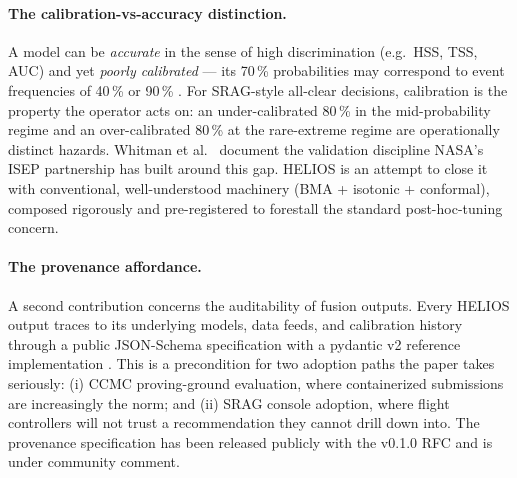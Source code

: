 \documentclass[11pt,letterpaper]{article}
\begin{document}
\paragraph{The calibration-vs-accuracy distinction.}
A model can be \emph{accurate} in the sense of high discrimination
(e.g.\ HSS, TSS, AUC) and yet \emph{poorly calibrated} --- its 70\,\%
probabilities may correspond to event frequencies of 40\,\% or 90\,\%
\cite{niculescu2005}.  For SRAG-style all-clear decisions, calibration is the
property the operator acts on: an under-calibrated 80\,\% in the
mid-probability regime and an over-calibrated 80\,\% at the rare-extreme
regime are operationally distinct hazards.  Whitman et al.\ \cite{whitman2023,whitman2024}
document the validation discipline NASA's ISEP partnership has built around
this gap.  HELIOS is an attempt to close it with conventional, well-understood
machinery (BMA + isotonic + conformal), composed rigorously and pre-registered
to forestall the standard post-hoc-tuning concern.

\paragraph{The provenance affordance.}
A second contribution concerns the auditability of fusion outputs.  Every
HELIOS output traces to its underlying models, data feeds, and calibration
history through a public JSON-Schema specification with a pydantic v2 reference
implementation \cite{helios_provenance_spec}.  This is a precondition for two
adoption paths the paper takes seriously: (i) CCMC proving-ground evaluation,
where containerized submissions are increasingly the norm; and (ii) SRAG
console adoption, where flight controllers will not trust a recommendation
they cannot drill down into.  The provenance specification has been released
publicly with the v0.1.0 RFC \cite{helios_provenance_spec} and is under
community comment.
\end{document}
